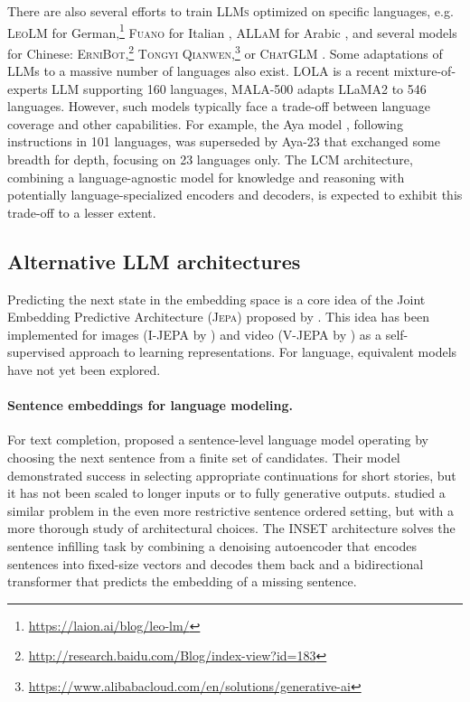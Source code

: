 \documentclass[twoside,11pt]{fairmeta}
\newcommand{\llm}{\textsc{LLM}\xspace}
\newcommand{\llms}{\textsc{LLMs}\xspace}
\newcommand{\jepa}{\textsc{Jepa}\xspace}
\begin{document}
There are also several efforts to train \llms optimized on specific languages, e.g. \textsc{LeoLM} for German,\footnote{\url{https://laion.ai/blog/leo-lm/}} \textsc{Fuano}
for Italian \citep{fuano:2024:arxiv}, \textsc{ALLaM} for Arabic \citep{allam:2024:arxiv}, and several models for Chinese: \textsc{ErniBot},\footnote{\url{http://research.baidu.com/Blog/index-view?id=183}} \textsc{Tongyi Qianwen},\footnote{\url{https://www.alibabacloud.com/en/solutions/generative-ai}} or \textsc{ChatGLM} \citep{chatglm:2024:arxiv}. Some adaptations of LLMs to a massive number of languages also exist. LOLA \citep{srivastava2024lola} is a recent mixture-of-experts LLM supporting 160 languages, MALA-500 \citep{ji2024emma} adapts LLaMA2 to 546 languages. However, such models typically face a trade-off between language coverage and other capabilities. For example, the Aya model \citep{ustun2024aya}, following instructions in 101 languages, was superseded by Aya-23 \citep{aryabumi2024aya} that exchanged some breadth for depth, focusing on 23 languages only. The LCM architecture, combining a language-agnostic model for knowledge and reasoning with potentially language-specialized encoders and decoders, is expected to exhibit this trade-off to a lesser extent.



\subsection{Alternative \llm architectures}

Predicting the next state in the embedding space is a core idea of the Joint Embedding Predictive Architecture (\jepa) proposed by \citet{jepa:openreview:2022}. This idea has been implemented for images (\textsc{I-JEPA} by \citet{ijepa:arxiv:2023}) and video (\textsc{V-JEPA} by \citet{vjepa:arxiv:2023}) as a self-supervised approach to learning representations. For language, equivalent models have not yet been explored.

\paragraph{Sentence embeddings for language modeling.} For text completion, \citet{storyline-llm:arxiv:2020} proposed a sentence-level language model operating by choosing the next sentence from a finite set of candidates. Their model demonstrated success in selecting appropriate continuations for short stories, but it has not been scaled to longer inputs or to fully generative outputs. \citet{golestani2021using} studied a similar problem in the even more restrictive sentence ordered setting, but with a more thorough study of architectural choices. The INSET architecture \citep{inset:acl:2020} solves the sentence infilling task by combining a denoising autoencoder that encodes sentences into fixed-size vectors and decodes them back and a bidirectional transformer that predicts the embedding of a missing sentence. 
\end{document}
